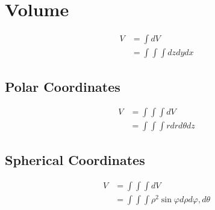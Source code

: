 \section{Volume}

  \begin{align}
    V &= \int dV \\
    &= \int \int \int dz dy dx
  \end{align}

  \subsection{Polar Coordinates}

    \begin{align}
      V &= \int \int \int dV \\
      &= \int \int \int r dr d\theta dz
    \end{align}

  \subsection{Spherical Coordinates}

    \begin{align}
      V &= \int \int \int dV \\
      &= \int \int \int \rho^{2} \sin \varphi d\rho d\varphi, d\theta
    \end{align}